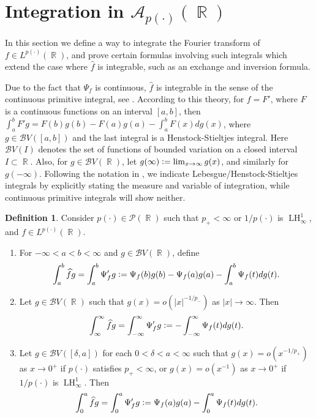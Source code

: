 \documentclass[11pt,reqno]{amsart}
\theoremstyle{definition}
\theoremstyle{definition}
\theoremstyle{definition}
\newtheorem{definition}[theorem]{Definition}
\DeclareMathOperator{\R}{\mathbb{R}}
\newcommand{\p}{p(\cdot)}
\newcommand{\Lp}{L^{\p}(\R)}
\newcommand{\BV}{\mathcal{B}V}
\newcommand{\defeq}{\vcentcolon=}
\newcommand{\LH}{\operatorname{LH}_\infty^1}
\begin{document}
\section{Integration in \texorpdfstring{$\mathcal{A}_{\p}(\R)$}{}}\label{sec-integration-fourier}


In this section we define a way to integrate the Fourier transform of $f\in\Lp$, and prove certain formulas involving such integrals which extend the case where $\widehat{f}$ is integrable, such as an exchange and inversion formula.

Due to the fact that $\Psi_f$ is continuous, $\widehat{f}$ is integrable in the sense of the continuous primitive integral, see \cite{Talvila2007}. According to this theory, for $f=F'$, where $F$ is a continuous functions on an interval $[a,b]$, then $\int_a^b F'g=F(b)g(b)-F(a)g(a)-\int_a^bF(x)dg(x)$, where $g\in \mathcal{B}V([a,b])$ and the last integral is a Henstock-Stieltjes integral. Here $\mathcal{B}V(I)$ denotes the set of functions of bounded variation on a closed interval $I\subset \R$. Also, for $g\in\mathcal{B}V(\R)$, let $g(\infty)\defeq\lim_{x\to\infty}g(x)$, and similarly for $g(-\infty)$. Following the notation in \cite{Talvila2007}, we  indicate Lebesgue/Henstock-Stieltjes integrals by explicitly stating the measure and variable of integration, while continuous primitive integrals will show neither.

\begin{definition}\label{definitionintegral}
     Consider $\p\in\mathcal{P}(\R)$ such that $p_{+}<\infty$ or $1/\p$ is $\LH$, and $f\in L^{\p}(\R)$.
    \begin{enumerate}
        \item For $-\infty<a<b<\infty$ and $g\in\mathcal{B}V(\R)$, define
        \begin{equation*}
\int_a^b\widehat{f}g=\int_a^b\Psi_f'g\defeq\Psi_f(b)g(b)-\Psi_f(a)g(a)-\int_a^b\Psi_f(t)dg(t).
        \end{equation*}
        \item Let $g\in\BV(\R)$ such that $g(x)=o(|x|^{-1/p_{-}})$ as $|x|\to \infty$. Then 
        \begin{equation*}
\int_{\infty}^{\infty}\widehat{f}g=\int_{-\infty}^{\infty}\Psi_f'g\defeq-\int_{-\infty}^\infty \Psi_f(t)dg(t).
        \end{equation*}
        \item Let $g\in\BV([\delta,a])$ for each $0<\delta<a<\infty$ such that $g(x)=o(x^{-1/p_{+}})$ as $x\to 0^+$ if $\p$ satisfies $p_+<\infty$, or $g(x)=o(x^{-1})$ as $x\to 0^+$ if $1/\p$ is $\LH$. Then 
        \begin{equation*}
            \int_0^a \widehat{f}g=\int_0^a \Psi'_fg\defeq\Psi_f(a)g(a)-\int_0^a\Psi_f(t)dg(t).
        \end{equation*}
    \end{enumerate}
\end{definition}
\end{document}
